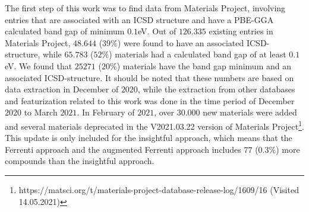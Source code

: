 \begin{comment}
\section{Time of extraction and featurization}

The initial thought behind

\begin{table}[!ht]
\centering
\caption{}
\label{tab:timing-extraction}
\noindent\makebox[\textwidth]{
\begin{tabular}{M{3.0cm} M{4.0cm} M{4.0cm}}
  \hline
  \hline
  Database & Extraction period & Estimated time usage  \\
  \hline
  Materials Project & December $2020$ & $5$ min \\
  Citrine Informatics & December $2020$ & $2$ min  \\
  OQMD & December $2020$ & $3$ min \\
  AFLOW & January $2020$ - February $2021$ & $17$ days \\
  AFLOW-ML & January $2020$ - February $2021$ & $16$ days \\
  JARVIS-DFT & January $2020$ & $5$ min \\
  \hline
  \hline
\end{tabular}
}
\end{table}

\end{comment}
The first step of this work was to find data from Materials Project, involving entries that are associated with an ICSD structure and have a PBE-GGA calculated band gap of minimum $0.1$eV. Out of $126.335$ existing entries in Materials Project, $48.644$ ($39\%$) were found to have an associated ICSD-structure, while $65.783$ ($52\%$) materials had a calculated band gap of at least $0.1$eV. We found that $25271$ ($20\%$) materials have the band gap minimum and an associated ICSD-structure. It should be noted that these numbers are based on data extraction in December of $2020$, while the extraction from other databases and featurization related to this work was done in the time period of December $2020$ to March $2021$. In February of $2021$, over $30.000$ new materials were added and several materials deprecated in the V2021.03.22 version of Materials Project\footnote{https://matsci.org/t/materials-project-database-release-log/1609/16 (Visited 14.05.2021)}. This update is only included for the insightful approach, which means that the Ferrenti approach and the augmented Ferrenti approach includes $77$ ($0.3\%$) more compounds than the insightful approach.

